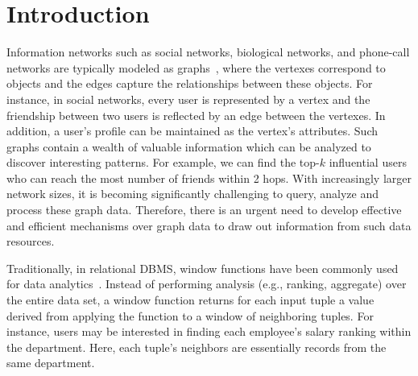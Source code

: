 \section{Introduction}
Information networks such as social networks, 
biological networks, and phone-call networks are 
typically modeled as graphs~\cite{chen2008graph},
where the vertexes correspond to objects and the edges
capture the relationships between these objects.
For instance, in social networks, every user is represented by
a vertex and the friendship between two users is reflected by an edge between
the vertexes. In addition, a user's profile can be maintained as
the vertex's attributes. Such graphs contain a wealth of valuable 
information which can be analyzed to discover interesting patterns. 
For example, we can find the top-$k$ influential users who can 
reach the most number of friends within 2 hops. With increasingly
larger network sizes, it is becoming significantly challenging to 
query, analyze and process these graph data. Therefore, there is an urgent need 
to develop effective and efficient mechanisms over graph data to draw out
information from such data resources.
 
Traditionally, in relational DBMS, window functions have been commonly
used for data analytics~\cite{cao2012optimization, bellamkonda2013adaptive}. 
Instead of performing analysis (e.g., ranking, aggregate) over the entire data set, 
a window function returns for each input tuple a value derived from applying the function 
to a window of neighboring tuples. For instance, users may be interested in finding 
each employee's salary ranking within the department. Here, 
each tuple's neighbors are essentially records from the same department.


